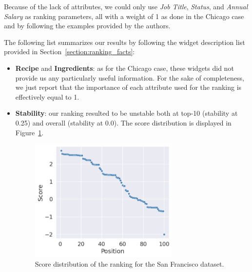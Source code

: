 Because of the lack of attributes, we could only use \textit{Job Title}, \textit{Status}, and \textit{Annual Salary} as ranking parameters, all with a weight of 1 as done in the Chicago case and by following the examples provided by the authors.

The following list summarizes our results by following the widget description list provided in Section~\ref{section:ranking_facts}:
\begin{itemize}
\item \textbf{Recipe} and \textbf{Ingredients}: as for the Chicago case, these widgets did not provide us any particularly useful information. For the sake of completeness, we just report that the importance of each attribute used for the ranking is effectively equal to 1.
\item \textbf{Stability}: our ranking resulted to be unstable both at top-10 (stability at 0.25) and overall (stability at 0.0). The score distribution is displayed in Figure~\ref{fig:san_francisco_rankingfacts2}.

\begin{figure}[t!]
\centering
\includegraphics[width=0.7\textwidth]{figures/san_francisco_rankingfacts2.png}
\caption{Score distribution of the ranking for the San Francisco dataset.}
\label{fig:san_francisco_rankingfacts2}
\end{figure}


\end{itemize}
